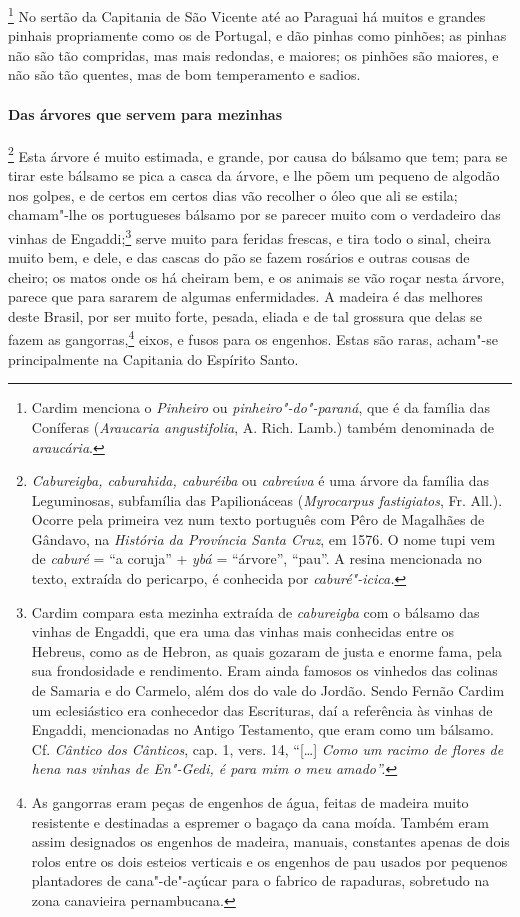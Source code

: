 \footnote{ Cardim menciona o \textit{Pinheiro} ou
\textit{pinheiro"-do"-paraná}, que é da família das Coníferas
(\textit{Araucaria angustifolia}, A. Rich. Lamb.) também denominada de
\textit{araucária}.} No sertão da Capitania de São Vicente 
até ao Paraguai há muitos e grandes pinhais propriamente como os de
Portugal, e dão pinhas como pinhões; as pinhas não são tão compridas,
mas mais redondas, e maiores; os pinhões são maiores, e não são tão
quentes, mas de bom temperamento e sadios.

\paragraph{Das árvores que servem para mezinhas}

\footnote{ \textit{Cabureigba, caburahida,
caburéiba} ou \textit{cabreúva} é uma árvore da família das
Leguminosas, subfamília das Papilionáceas (\textit{Myrocarpus
fastigiatos}, Fr. All.). Ocorre pela primeira vez num texto português
com Pêro de Magalhães de Gândavo, na \textit{História da Província Santa
Cruz}, em 1576. O nome tupi vem de \textit{caburé} = ``a
coruja'' + \textit{ybá} = ``árvore'', ``pau''. A resina mencionada no texto,
extraída do pericarpo, é conhecida por
\textit{caburé"-icica.}} Esta árvore é muito estimada, e
grande, por causa do bálsamo que tem; para se tirar este bálsamo se
pica a casca da árvore, e lhe põem um pequeno de algodão nos golpes, e
de certos em certos dias vão recolher o óleo que ali se estila;
chamam"-lhe os portugueses bálsamo por se parecer muito com o verdadeiro
das vinhas de Engaddi;\footnote{ Cardim compara esta mezinha extraída
de \textit{cabureigba} com o bálsamo das vinhas de Engaddi, que era uma
das vinhas mais conhecidas entre os Hebreus, como as de Hebron, as
quais gozaram de justa e enorme fama, pela sua frondosidade e
rendimento. Eram ainda famosos os vinhedos das colinas de Samaria e do
Carmelo, além dos do vale do Jordão. Sendo Fernão Cardim um
eclesiástico era conhecedor das Escrituras, daí a referência às vinhas
de Engaddi, mencionadas no Antigo Testamento, que eram como um bálsamo.
Cf. \textit{Cântico dos Cânticos}, cap. 1, vers. 14, ``[\ldots] \textit{Como um
racimo de flores de hena nas vinhas de En"-Gedi, é para mim o meu
amado''.}} serve muito para feridas frescas, e tira todo o sinal,
cheira muito bem, e dele, e das cascas do pão se fazem rosários e
outras cousas de cheiro; os matos onde os há cheiram bem, e os animais
se vão roçar nesta árvore, parece que para sararem de algumas
enfermidades. A madeira é das melhores deste Brasil, por ser muito
forte, pesada, eliada e de tal grossura que delas se fazem as 
gangorras,\footnote{ As gangorras eram peças de engenhos de água, feitas de
madeira muito resistente e destinadas a espremer o bagaço da cana
moída. Também eram assim designados os engenhos de madeira, manuais,
constantes apenas de dois rolos entre os dois esteios verticais e os
engenhos de pau usados por pequenos plantadores de cana"-de"-açúcar para
o fabrico de rapaduras, sobretudo na zona canavieira pernambucana.}
eixos, e fusos para os engenhos. Estas são raras, acham"-se
principalmente na Capitania do Espírito Santo.

